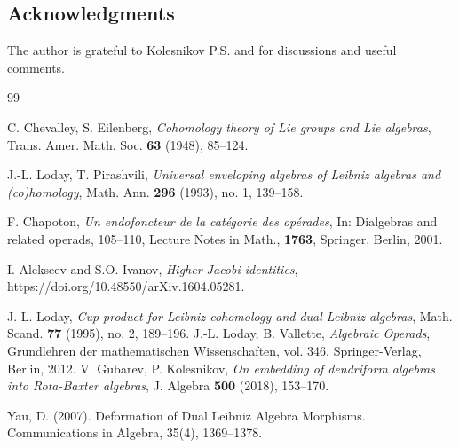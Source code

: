 \documentclass[a4paper, 12pt,oneside,reqno]{amsart}
\begin{document}
\subsection*{Acknowledgments}
The author is grateful 
to  Kolesnikov P.S.
 and for discussions and useful comments.
\begin{thebibliography}{99}

C. Chevalley, S. Eilenberg,
\emph{Cohomology theory of Lie groups and Lie algebras},
Trans. Amer. Math. Soc. \textbf{63} (1948), 85--124.

J.-L. Loday, T. Pirashvili,
\emph{Universal enveloping algebras of Leibniz algebras and (co)homology},
Math. Ann. \textbf{296} (1993), no. 1, 139--158.

F. Chapoton,
\emph{Un endofoncteur de la catégorie des opérades},
In: Dialgebras and related operads, 105--110,
Lecture Notes in Math., \textbf{1763}, Springer, Berlin, 2001.

I. Alekseev and S.O. Ivanov, \emph{Higher Jacobi identities},
https://doi.org/10.48550/arXiv.1604.05281.


J.-L. Loday,
\emph{Cup product for Leibniz cohomology and dual Leibniz algebras},
Math. Scand. \textbf{77} (1995), no. 2, 189--196.
J.-L. Loday, B. Vallette,
\emph{Algebraic Operads},
Grundlehren der mathematischen Wissenschaften, vol. 346,
Springer-Verlag, Berlin, 2012.
V. Gubarev, P. Kolesnikov,
\emph{On embedding of dendriform algebras into Rota-Baxter algebras},
J. Algebra \textbf{500} (2018), 153--170.

Yau, D. (2007). Deformation of Dual Leibniz Algebra Morphisms. Communications in Algebra, 35(4), 1369–1378. 
\end{thebibliography}
\end{document}
